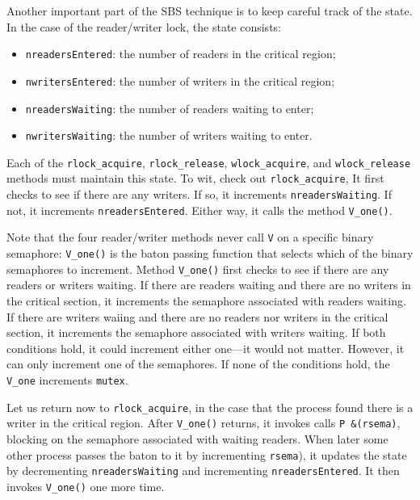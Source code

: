 \documentclass{report}
\begin{document}
Another important part of the SBS technique is to keep careful track of the
state.  In the case of the reader/writer lock, the state consists:
\begin{itemize}
\item \texttt{nreadersEntered}: the number of readers in the critical region;
\item \texttt{nwritersEntered}: the number of writers in the critical region;
\item \texttt{nreadersWaiting}: the number of readers waiting to enter;
\item \texttt{nwritersWaiting}: the number of writers waiting to enter.
\end{itemize}
Each of the
\texttt{rlock\_acquire}, \texttt{rlock\_release},
\texttt{wlock\_acquire}, and \texttt{wlock\_release} methods must maintain
this state.
To wit, check out \texttt{rlock\_acquire},  It first checks to see if there
are any writers.  If so, it increments \texttt{nreadersWaiting}.  If not,
it increments \texttt{nreadersEntered}.
Either way, it calls the method \texttt{V\_one()}.

Note that the four
reader/writer methods never call \texttt{V} on a specific binary semaphore:
\texttt{V\_one()} is the baton passing function that selects which of the
binary semaphores to increment.
Method \texttt{V\_one()} first checks to see if there are any readers or
writers waiting.  If there are readers waiting and there are no writers
in the critical section, it increments the semaphore associated with
readers waiting.  If there are writers waiing and there are no readers
nor writers in the critical section, it increments the semaphore associated
with writers waiting.  If both conditions hold, it could increment either
one---it would not matter.  However, it can only increment one of the semaphores.
If none of the conditions hold, the \texttt{V\_one} increments \texttt{mutex}.

Let us return now to \texttt{rlock\_acquire}, in the case that the process
found there is a writer in the critical region.  After \texttt{V\_one()} returns,
it invokes calls \texttt{P~\&(rsema)}, blocking on the semaphore associated
with waiting readers.  When later some other process passes the baton to
it by incrementing \texttt{rsema}), it updates the state by decrementing
\texttt{nreadersWaiting} and incrementing \texttt{nreadersEntered}.  It
then invokes \texttt{V\_one()} one more time.
\end{document}

